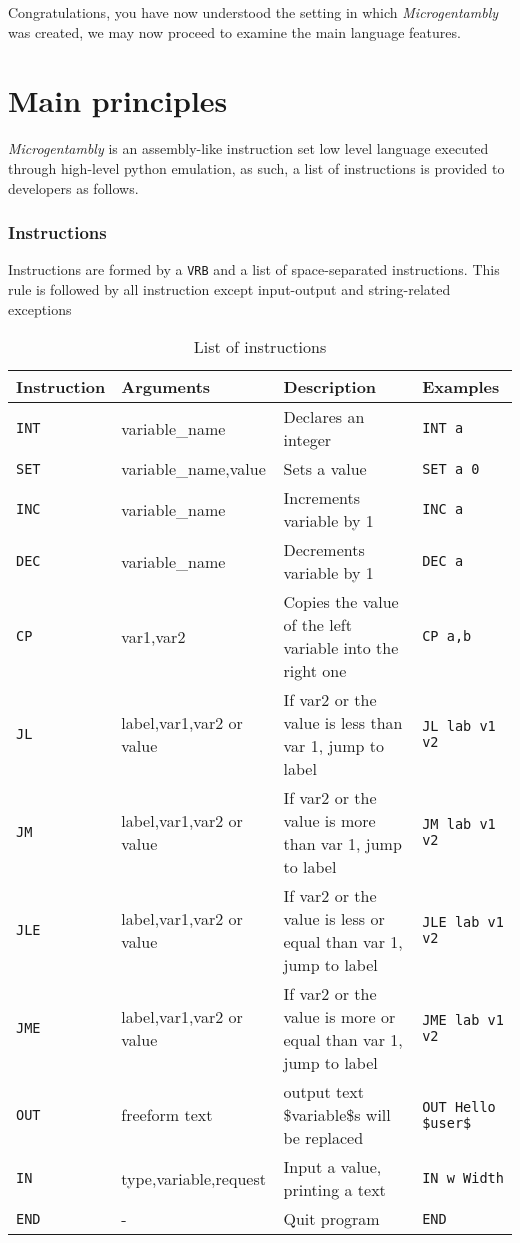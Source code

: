 \documentclass[]{article}
\begin{document}
		Congratulations, you have now understood the setting in which \emph{Microgentambly} was created, we may now proceed to examine the main language features.
	\part{Main principles}
	\emph{Microgentambly} is an assembly-like instruction set low level language executed through high-level python emulation, as such, a list of instructions is provided to developers as follows.
	\section{Instructions}
	Instructions are formed by a \verb|VRB| and a list of space-separated instructions.
	This rule is followed by all instruction except input-output and string-related exceptions\\
	\newpage
	\begin{table}
		\centering
		\caption{List of instructions}
		\label{my-label}
		\begin{adjustbox}{width=\textwidth}
		\begin{tabular}{|l|l|l|l|}
			\hline
			Instruction & Arguments & Description & Examples \\ \hline
			\hline
			\verb|INT| & variable\_name & Declares an integer & \verb|INT a| \\ \hline
			\verb|SET| & variable\_name,value & Sets a value & \verb|SET a 0| \\ \hline
			\verb|INC| & variable\_name & Increments variable by 1 & \verb|INC a| \\ \hline
			\verb|DEC| & variable\_name & Decrements variable by 1 & \verb|DEC a| \\ \hline
			\verb|CP| & var1,var2 & Copies the value of the left variable into the right one & \verb|CP a,b| \\ \hline
			\verb|JL| & label,var1,var2 or value & If var2 or the value is less than var 1, jump to label & \verb|JL lab v1 v2| \\ \hline
			\verb|JM| & label,var1,var2 or value & If var2 or the value is more than var 1, jump to label & \verb|JM lab v1 v2| \\ \hline
			\verb|JLE| & label,var1,var2 or value & If var2 or the value is less or equal than var 1, jump to label & \verb|JLE lab v1 v2| \\ \hline
			\verb|JME| & label,var1,var2 or value & If var2 or the value is more or equal than var 1, jump to label & \verb|JME lab v1 v2| \\ \hline
			\verb|OUT| & freeform text & output text \$variable\$s will be replaced & \verb|OUT Hello $user$|\\ \hline
			\verb|IN| & type,variable,request & Input a value, printing a text & \verb|IN w Width| \\ \hline
			\verb|END| & - & Quit program & \verb|END| \\ \hline
		\end{tabular}
	\end{adjustbox}
	\end{table}
\end{document}
